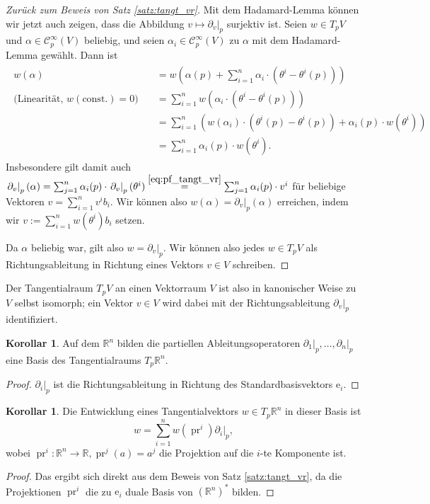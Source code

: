 \documentclass[a4paper]{scrreprt}
\numberwithin{equation}{chapter}
\newcommand{\e}{\mathrm{e}}
\DeclareMathOperator{\pr}{pr}
\newcommand{\sC}{\mathcal{C}^{\infty}}
\theoremstyle{definition}
\newtheorem{kor}[defn]{Korollar}
\begin{document}
\begin{proof}[Zurück zum Beweis von Satz \ref{satz:tangt_vr}]
	Mit dem Hadamard-Lemma können wir jetzt auch zeigen, dass die Abbildung $v \mapsto \left.\partial_v\right|_p$ surjektiv ist. Seien $w \in T_pV$ und $\alpha \in \sC_p(V)$ beliebig, und seien $\alpha_i \in \sC_p(V)$ zu $\alpha$ mit dem Hadamard-Lemma gewählt. Dann ist
	\begin{align}\begin{split}
		w(\alpha) &= w\left(\alpha(p) + \sum_{i=1}^n \alpha_i \cdot (\theta^i - \theta^i(p))\right)\\
		\text{(Linearität, $w(\text{const.}) = 0$)} \quad &= \sum_{i=1}^n w(\alpha_i \cdot (\theta^i - \theta^i(p)))\\
		&= \sum_{i=1}^n \left( w(\alpha_i) \cdot (\theta^i(p) - \theta^i(p)) + \alpha_i(p) \cdot w(\theta^i) \right)\\
		&= \sum_{i=1}^n \alpha_i(p) \cdot w(\theta^i).
	\end{split}\end{align}
	Insbesondere gilt damit auch $\left.\partial_v\right|_p (\alpha) = \sum_{j=1}^n \alpha_i(p) \cdot \left.\partial_v\right|_p (\theta^i) \overset{\eqref{eq:pf_tangt_vr}}{=} \sum_{j=1}^n \alpha_i(p) \cdot v^i$ für beliebige Vektoren $v = \sum_{i=1}^n v^i b_i$. Wir können also $w(\alpha) = \left.\partial_v\right|_p (\alpha)$ erreichen, indem wir $v := \sum_{i=1}^n w(\theta^i) b_i$ setzen.

	Da $\alpha$ beliebig war, gilt also $w = \left.\partial_v\right|_p$. Wir können also jedes $w \in T_pV$ als Richtungsableitung in Richtung eines Vektors $v\in V$ schreiben.
\end{proof}

Der Tangentialraum $T_pV$ an einen Vektorraum $V$ ist also in kanonischer Weise zu $V$ selbst isomorph; ein Vektor $v \in V$ wird dabei mit der Richtungsableitung $\left.\partial_v\right|_p$ identifiziert.

\begin{kor}
	Auf dem $\mathbb R^n$ bilden die partiellen Ableitungsoperatoren $\left.\partial_1\right|_p, \dots, \left.\partial_n\right|_p$ eine Basis des Tangentialraums $T_p\mathbb R^n$.

	\begin{proof}
		$\left.\partial_i\right|_p$ ist die Richtungsableitung in Richtung des Standardbasisvektors $\e_i$.
	\end{proof}
\end{kor}

\begin{kor} \label{kor:entw_tangt_Rn}
	Die Entwicklung eines Tangentialvektors $w \in T_p\mathbb R^n$ in dieser Basis ist
	\[w = \sum_{i=1}^n w(\pr^i) \left.\partial_i\right|_p,\]
	wobei $\pr^i\colon \mathbb R^n \to \mathbb R, \pr^j(a) = a^j$ die Projektion auf die $i$-te Komponente ist.

	\begin{proof}
		Das ergibt sich direkt aus dem Beweis von Satz \ref{satz:tangt_vr}, da die Projektionen $\pr^i$ die zu $\e_i$ duale Basis von $(\mathbb R^n)^*$ bilden.
	\end{proof}
\end{kor}
\end{document}

